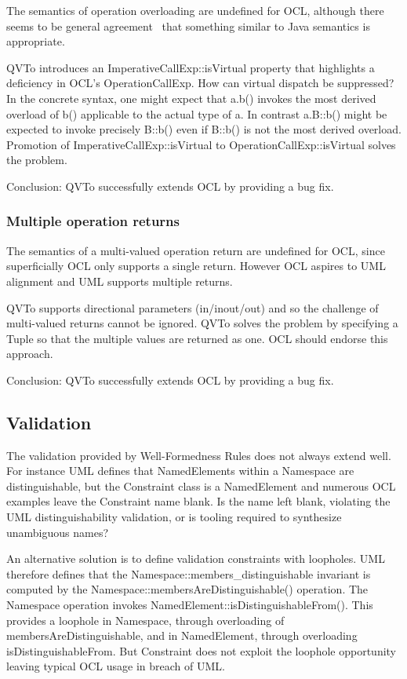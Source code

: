 \documentclass{llncs}
\begin{document}
The semantics of operation overloading are undefined for OCL, although there seems to be general agreement~\cite{aachen} that something similar to Java semantics is appropriate.

QVTo introduces an ImperativeCallExp::isVirtual property that highlights a deficiency in OCL's OperationCallExp. How can virtual dispatch be suppressed? In the concrete syntax, one might expect that a.b() invokes the most derived overload of b() applicable to the actual type of a. In contrast a.B::b() might be expected to invoke precisely B::b() even if B::b() is not the most derived overload. Promotion of ImperativeCallExp::isVirtual to OperationCallExp::isVirtual solves the problem.

Conclusion: QVTo successfully extends OCL by providing a bug fix.

\subsubsection{Multiple operation returns}

The semantics of a multi-valued operation return are undefined for OCL, since superficially OCL only supports a single return. However OCL aspires to UML alignment and UML supports multiple returns.

QVTo supports directional parameters (in/inout/out) and so the challenge of multi-valued returns cannot be ignored. QVTo solves the problem by specifying a Tuple so that the multiple values are returned as one. OCL should endorse this approach. 

Conclusion: QVTo successfully extends OCL by providing a bug fix.

\subsection{Validation}\label{Validation}

The validation provided by Well-Formedness Rules does not always extend well. For instance UML defines that NamedElements within a Namespace are distinguishable, but the Constraint class is a NamedElement and numerous OCL examples leave the Constraint name blank. Is the name left blank, violating the UML distinguishability validation, or is tooling required to synthesize unambiguous names?

An alternative solution is to define validation constraints with loopholes. UML therefore defines that the Namespace::members\_distinguishable invariant is computed by the Namespace::membersAreDistinguishable() operation. The Namespace operation invokes  NamedElement::isDistinguishableFrom(). This provides a loophole in Namespace, through overloading of membersAreDistinguishable, and in NamedElement, through overloading isDistinguishableFrom. But Constraint does not exploit the loophole opportunity leaving typical OCL usage in breach of UML.
\end{document}
